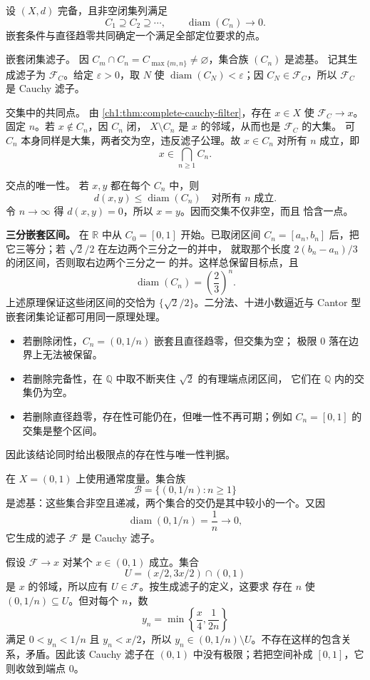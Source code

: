 \begin{example}
\label{ch1:exa:worked-nested-closed-sets}
设 $(X,d)$ 完备，且非空闭集列满足
\[
 C_1\supseteq C_2\supseteq\cdots,
 \qquad \operatorname{diam}(C_n)\longrightarrow0.
\]
嵌套条件与直径趋零共同确定一个满足全部定位要求的点。

\medskip
\noindent 嵌套闭集滤子。
因 $C_m\cap C_n=C_{\max\{m,n\}}\neq\varnothing$，集合族 $(C_n)$ 是滤基。
记其生成滤子为 $\mathcal F_C$。给定 $\varepsilon>0$，取 $N$ 使
$\operatorname{diam}(C_N)<\varepsilon$；因 $C_N\in\mathcal F_C$，所以
$\mathcal F_C$ 是 Cauchy 滤子。

\medskip
\noindent 交集中的共同点。
由 \cref{ch1:thm:complete-cauchy-filter}，存在 $x\in X$ 使
$\mathcal F_C\to x$。固定 $n$。若 $x\notin C_n$，因 $C_n$ 闭，
$X\setminus C_n$ 是 $x$ 的邻域，从而也是 $\mathcal F_C$ 的大集。
可 $C_n$ 本身同样是大集，两者交为空，违反滤子公理。故
$x\in C_n$ 对所有 $n$ 成立，即
\[
 x\in\bigcap_{n\geq1}C_n.
\]

\medskip
\noindent 交点的唯一性。
若 $x,y$ 都在每个 $C_n$ 中，则
\[
 d(x,y)\leq\operatorname{diam}(C_n)
 \quad\text{对所有 }n\text{ 成立}.
\]
令 $n\to\infty$ 得 $d(x,y)=0$，所以 $x=y$。因而交集不仅非空，而且
恰含一点。

\medskip
\textbf{三分嵌套区间。}
在 $\mathbb R$ 中从 $C_0=[0,1]$ 开始。已取闭区间
$C_n=[a_n,b_n]$ 后，把它三等分；若 $\sqrt2/2$ 在左边两个三分之一的并中，
就取那个长度 $2(b_n-a_n)/3$ 的闭区间，否则取右边两个三分之一
的并。这样总保留目标点，且
\[
 \operatorname{diam}(C_n)=\left(\frac23\right)^n.
\]
上述原理保证这些闭区间的交恰为 $\{\sqrt2/2\}$。二分法、十进小数逼近与
Cantor 型嵌套闭集论证都可用同一原理处理。

\medskip
\begin{itemize}
  \item 若删除闭性，$C_n=(0,1/n)$ 嵌套且直径趋零，但交集为空；
        极限 $0$ 落在边界上无法被保留。
  \item 若删除完备性，在 $\mathbb Q$ 中取不断夹住 $\sqrt2$ 的有理端点闭区间，
        它们在 $\mathbb Q$ 内的交集仍为空。
  \item 若删除直径趋零，存在性可能仍在，但唯一性不再可期；例如
        $C_n=[0,1]$ 的交集是整个区间。
\end{itemize}
因此该结论同时给出极限点的存在性与唯一性判据。
\end{example}

\begin{example}
在 \(X=(0,1)\) 上使用通常度量。集合族
\[
 \mathcal B=\{(0,1/n):n\geq1\}
\]
是滤基：这些集合非空且递减，两个集合的交仍是其中较小的一个。又因
\[
 \operatorname{diam}(0,1/n)=\frac1n\longrightarrow0,
\]
它生成的滤子 \(\mathcal F\) 是 Cauchy 滤子。

假设 \(\mathcal F\to x\) 对某个 \(x\in(0,1)\) 成立。集合
\[
 U=(x/2,3x/2)\cap(0,1)
\]
是 \(x\) 的邻域，所以应有 \(U\in\mathcal F\)。按生成滤子的定义，这要求
存在 \(n\) 使 \((0,1/n)\subseteq U\)。但对每个 \(n\)，数
\[
 y_n=\min\left\{\frac{x}{4},\frac1{2n}\right\}
\]
满足 \(0<y_n<1/n\) 且 \(y_n<x/2\)，所以
\(y_n\in(0,1/n)\setminus U\)。不存在这样的包含关系，矛盾。因此该 Cauchy
滤子在 $(0,1)$ 中没有极限；若把空间补成 $[0,1]$，它则收敛到端点 $0$。
\end{example}

